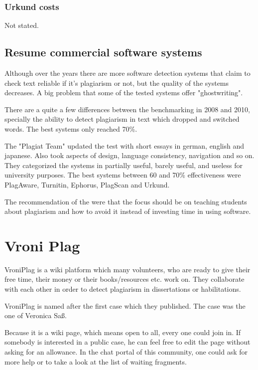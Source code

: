 \subsubsection{Urkund costs}
Not stated.


\newpage

\subsection{Resume commercial software systems}

Although over the years there are more software detection systems that claim to check text reliable if it's plagiarism or not, but the quality of the systems decreases. 
A big problem that some of the tested systems offer "ghostwriting".

There are a quite a few differences between the benchmarking in 2008 and 2010, specially the ability to detect plagiarism in text which dropped and switched words. The best systems only reached 70\%.

The "Plagiat Team" updated the test with short essays in german, english and japanese.
Also took aspects of design, language consistency, navigation and so on.
They  categorized the systems in partially useful, barely useful, and useless for university purposes. The best systems between 60 and 70\% effectiveness were PlagAware, Turnitin, Ephorus, PlagScan and Urkund. \citep{PlagiatTeam} 

The recommendation of  the \citet{PlagiatTeam} were that the focus should be on teaching students about plagiarism and how to avoid it instead of investing time in using software. 


\section{Vroni Plag}
VroniPlag is a wiki platform which many volunteers, who are ready to give their free time, their money or 
their books/resources etc. work on. They collaborate with each other in order to detect plagiarism in dissertations or
habilitations.



VroniPlag is named after the first case which they published. The case was the one of Veronica Saß.

Because it is a wiki page, which means open to all, every one could join in. If somebody is interested in a public 
case, he can feel free to edit the page without asking for an allowance. In the chat portal of this community, one could 
ask for more help or to take a look at the list of waiting fragments.

